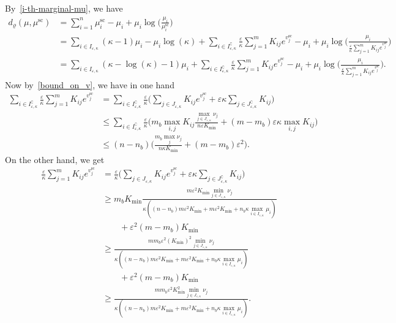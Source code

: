 By~\eqref{i-th-marginal-mu}, we have
\begin{align*}
d_\varrho({\mu} ,{\mu}^{\text{sc}}) &= \sum_{i=1}^n  {\mu}^{\text{sc}}_i - {\mu}_i + {\mu}_i  \log\Big(\frac{{\mu}_i}{{\mu}^{\text{sc}}_i }\Big)\\
&= \sum_{i\in I_{\varepsilon,\kappa}} (\kappa-1)\mu_i - \mu_i\log(\kappa) + \sum_{i\in I^\complement_{\varepsilon,\kappa}}\frac \varepsilon\kappa\sum_{j=1}^m K_{ij} e^{v^{\text{sc}}_j} - \mu_i + \mu_i \log\Big(\frac{\mu_i}{\frac \varepsilon\kappa\sum_{j=1}^m K_{ij} e^{v^{\text{sc}}_j}}\Big)\\
&= \sum_{i\in I_{\varepsilon,\kappa}} (\kappa-\log(\kappa)-1)\mu_i  + \sum_{i\in I^\complement_{\varepsilon,\kappa}}\frac \varepsilon\kappa\sum_{j=1}^m K_{ij} e^{v^{\text{sc}}_j} - \mu_i + \mu_i \log\Big(\frac{\mu_i}{\frac \varepsilon\kappa\sum_{j=1}^m K_{ij} e^{v^{\text{sc}}_j}}\Big).
\end{align*}
Now by~\eqref{bound_on_v}, we have in one hand 
\begin{align*}
\sum_{i\in I^\complement_{\varepsilon,\kappa}}\frac \varepsilon\kappa\sum_{j=1}^m K_{ij} e^{v^{\text{sc}}_j}&= \sum_{i\in I^\complement_{\varepsilon,\kappa}}\frac \varepsilon\kappa \Big(\sum_{j\in J_{\varepsilon,\kappa}}K_{ij} e^{v^{\text{sc}}_j} + \varepsilon \kappa\sum_{j\in J^\complement_{\varepsilon,\kappa}}K_{ij}\Big)\\
&\leq \sum_{i\in I^\complement_{\varepsilon,\kappa}}\frac \varepsilon\kappa \Big(m_b \max_{i,j}K_{ij}\frac{\max_{j \in J_{\varepsilon,\kappa}} \nu_j}{n\varepsilon K_{\min}} + (m - m_b)\varepsilon\kappa\max_{i,j}K_{ij}\Big) \\
&\leq (n-n_b)\Big(\frac{m_b\max_{j} \nu_j}{n\kappa K_{\min}} + (m- m_b) \varepsilon^2\Big).
\end{align*}
On the other hand, we get
\begin{align*}
\frac \varepsilon\kappa\sum_{j=1}^m K_{ij} e^{v^{\text{sc}}_j}&=\frac \varepsilon\kappa \Big(\sum_{j\in J_{\varepsilon,\kappa}}K_{ij} e^{v^{\text{sc}}_j} + \varepsilon \kappa\sum_{j\in J^\complement_{\varepsilon,\kappa}}K_{ij}\Big)\\
&\geq m_bK_{\min} \frac{m\varepsilon^2K_{\min}\min_{j \in J_{\varepsilon,\kappa}}\nu_j}{\kappa((n-n_b)m\varepsilon^2K_{\min} + m\varepsilon^2K_{\min} + n_b\kappa\max_{i\in I_{\varepsilon,\kappa}}\mu_i)}\\
&\qquad +\varepsilon^2 (m- m_b) K_{\min}\\
&\geq \frac{mm_b\varepsilon^2(K_{\min})^2\min_{j \in J_{\varepsilon,\kappa}}\nu_j}{\kappa((n-n_b)m\varepsilon^2K_{\min}+ m\varepsilon^2K_{\min} + n_b\kappa\max_{i\in I_{\varepsilon,\kappa}}\mu_i)}\\
&\qquad +\varepsilon^2 (m- m_b) K_{\min}\\
&\geq \frac{mm_b\varepsilon^2K_{\min}^2\min_{j \in J_{\varepsilon,\kappa}}\nu_j}{\kappa((n-n_b)m\varepsilon^2K_{\min}+ m\varepsilon^2K_{\min} + n_b\kappa\max_{i\in I_{\varepsilon,\kappa}}\mu_i)}.
\end{align*}
